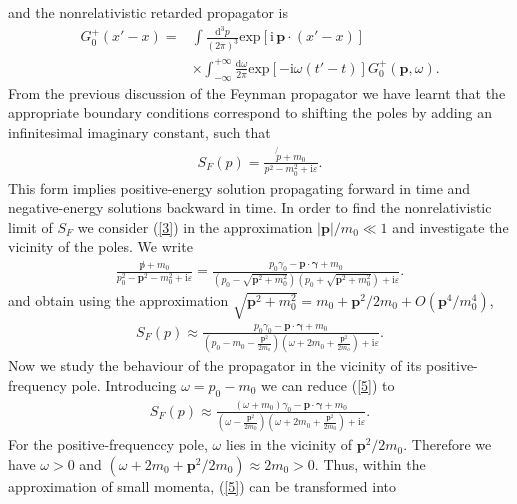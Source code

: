 \documentclass[fleqn]{article}
\begin{document}
\noindent and the nonrelativistic retarded propagator is
\begin{align}
\label{2}
G^+_0(x' - x) = &\int\frac{\text{d}^3p}{\left(2\pi\right)^3}\text{exp}\left[\text{i}\,\boldsymbol{p}\cdot\left(x'-x\right)\right]\nonumber\\
&\times\int^{+\infty}_{-\infty}\frac{\text{d}\omega}{2\pi}\text{exp}\left[-\text{i}\omega\left(t'-t\right)\right]G^+_0(\boldsymbol{p},\omega) .
\end{align}
From the previous discussion of the Feynman propagator we have learnt that the appropriate boundary conditions correspond to shifting the poles by adding an infinitesimal imaginary constant, such that
\begin{align}
\label{3}
S_F(p) = \frac{\not{p}+m_0}{p^2 -m^2_0 + \text{i}\varepsilon}.
\end{align}
This form implies positive-energy solution propagating forward in time and negative-energy solutions backward in time. In order to find the nonrelativistic limit of $S_F$ we consider (\ref{3}) in the approximation $|\boldsymbol{p}|/m_0\ll1$ and investigate the vicinity of the poles. We write
\begin{align}
\label{4}
\frac{\not p + m_0}{p^2_0 - \boldsymbol{p}^2 - m^2_0 + \text{i}\varepsilon} = \frac{p_0\gamma_0 -\boldsymbol{p}\cdot\boldsymbol{\gamma} + m_0}{\left(p_0 - \sqrt{\boldsymbol{p}^2 + m^2_0}\right)\left(p_0 +\sqrt{\boldsymbol{p}^2 + m^2_0}\right) + \text{i}\varepsilon}.
\end{align}
and obtain using the approximation $\sqrt{\boldsymbol{p}^2 + m^2_0} = m_0 +\boldsymbol{p}^2/2m_0+O(\boldsymbol{p}^4/m^4_0)$,
\begin{align}
\label{5}
S_F(p) \approx \frac{p_0\gamma_0 -\boldsymbol{p}\cdot\boldsymbol{\gamma} + m_0}{\left(p_0-m_0-\frac{\boldsymbol{p}^2}{2m_o}\right)\left(\omega + 2m_0 +\frac{\boldsymbol{p}^2}{2m_o}\right) + \text{i}\varepsilon}.
\end{align}
Now we study the behaviour of the propagator in the vicinity of its positive-frequency pole. Introducing $\omega=p_0-m_0$ we can reduce (\ref{5}) to
\begin{align}
\label{6}
S_F(p)\approx \frac{(\omega + m_0)\gamma_0 - \boldsymbol{p}\cdot\boldsymbol{\gamma} + m_0}{\left(\omega - \frac{\boldsymbol{p}^2}{2m_0}\right)\left(\omega + 2 m_0 +\frac{\boldsymbol{p}^2}{2m_0} \right) + \text{i}\varepsilon}.
\end{align}
For the positive-frequenccy pole, $\omega$ lies in the vicinity of $\boldsymbol{p}^2/2m_0$. Therefore we have $\omega>0$ and $(\omega + 2m_0 +\boldsymbol{p}^2/2m_0) \approx 2m_0 > 0$. Thus, within the approximation of small momenta, (\ref{5}) can be transformed into
\end{document}
